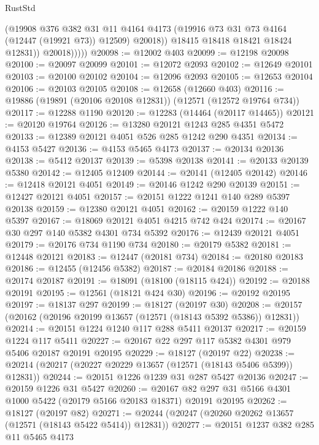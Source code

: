 \begin{lexlean}{RustStd}
\begin{coremodule}
                    (@19908
                      @376
                      @382
                      @31
                      @11
                      @4164
                      @4173
                      (@19916 @73 @31 @73 @4164 (@12447 (@19921 @73)) @12509)
                      @20018))
                  @18415
                  @18418
                  @18421
                  @18424
                  @12831))
              @20018)))))
@20098 := @12002 @403
@20099 := @12198 @20098
@20100 := @20097 @20099
@20101 := @12072 @2093
@20102 := @12649 @20101
@20103 := @20100 @20102
@20104 := @12096 @2093
@20105 := @12653 @20104
@20106 := @20103 @20105
@20108 := @12658 (@12660 @403)
@20116 := @19886 (@19891 (@20106 @20108 @12831)) (@12571 (@12572 @19764 @734))
@20117 := @12288 @1190
@20120 := @12283 (@14464 (@20117 @14465))
@20121 := @20120 @19764
@20126 := @13280 @20121 @1243 @285 @4351 @5472
@20133 := @12389 @20121 @4051 @526 @285 @1242 @290 @4351
@20134 := @4153 @5427
@20136 := @4153 @5465 @4173
@20137 := @20134 @20136
@20138 := @5412 @20137
@20139 := @5398 @20138
@20141 := @20133 @20139 @5380
@20142 := @12405 @12409
@20144 := @20141 (@12405 @20142)
@20146 := @12418 @20121 @4051
@20149 := @20146 @1242 @290 @20139
@20151 := @12427 @20121 @4051
@20157 := @20151 @1222 @1241 @140 @289 @5397 @20138
@20159 := @12380 @20121 @4051
@20162 := @20159 @1222 @140 @5397
@20167 := @18069 @20121 @4051 @4215 @742 @424
@20174 := @20167 @30 @297 @140 @5382 @4301 @734 @5392
@20176 := @12439 @20121 @4051
@20179 := @20176 @734 @1190 @734
@20180 := @20179 @5382
@20181 := @12448 @20121
@20183 := @12447 (@20181 @734)
@20184 := @20180 @20183
@20186 := @12455 (@12456 @5382)
@20187 := @20184 @20186
@20188 := @20174 @20187
@20191 := @18091 (@18100 (@18115 @424))
@20192 := @20188 @20191
@20195 := @12561 (@18121 @424 @30)
@20196 := @20192 @20195
@20197 := @18137 @297
@20199 := @18127 (@20197 @30)
@20208 := @20157 (@20162 (@20196 @20199 @13657 (@12571 (@18143 @5392 @5386)) @12831))
@20214 := @20151 @1224 @1240 @117 @288 @5411 @20137
@20217 := @20159 @1224 @117 @5411
@20227 := @20167 @22 @297 @117 @5382 @4301 @979 @5406 @20187 @20191 @20195
@20229 := @18127 (@20197 @22)
@20238 := @20214 (@20217 (@20227 @20229 @13657 (@12571 (@18143 @5406 @5399)) @12831))
@20244 := @20151 @1226 @1239 @31 @287 @5427 @20136
@20247 := @20159 @1226 @31 @5427
@20260 := @20167 @82 @297 @31 @5166 @4301 @1000 @5422 (@20179 @5166 @20183 @18371) @20191 @20195
@20262 := @18127 (@20197 @82)
@20271 := @20244 (@20247 (@20260 @20262 @13657 (@12571 (@18143 @5422 @5414)) @12831))
@20277 := @20151 @1237 @382 @285 @11 @5465 @4173

\end{coremodule}
\end{lexlean}
